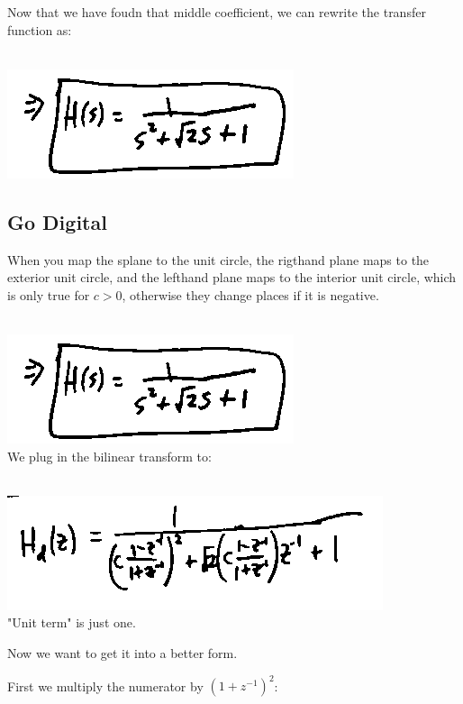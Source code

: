 Now that we have foudn that middle coefficient, we can rewrite 
the transfer function as:

\\
\includegraphics[scale=0.5]{frames/17d}\\

\subsection*{Go Digital}

When you map the splane to the unit circle, the rigthand plane maps
to the exterior unit circle, and the lefthand plane maps to the interior unit circle,
which is only true for $c > 0$, otherwise they change places if it is negative.

\\
\includegraphics[scale=0.5]{frames/17d}\\

We plug in the bilinear transform to:

\\
\includegraphics[scale=0.5]{frames/17f}\\

"Unit term" is just one. 

Now we want to get it into a better form. 

First we multiply the numerator by $(1 + z^{-1})^2$:

